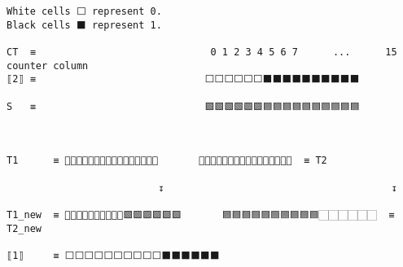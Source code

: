 \documentclass[varwidth=\maxdimen,margin=0.5cm,multi={verbatim}]{standalone}
\begin{document}
\begin{verbatim}
White cells ⬜ represent 0.
Black cells ⬛ represent 1.

CT  ≡                              0 1 2 3 4 5 6 7      ...      15  counter column
⟦2⟧ ≡                             ⬜⬜⬜⬜⬜⬜⬛⬛⬛⬛⬛⬛⬛⬛⬛⬛      

S   ≡                             🟩🟩🟩🟩🟩🟩🟦🟦🟦🟦🟦🟦🟦🟦🟦🟦



T1      ≡ 🏻🏻🏻🏻🏻🏻🏻🏻🏻🏻🏻🏻🏻🏻🏻🏻       🏻🏻🏻🏻🏻🏻🏻🏻🏻🏻🏻🏻🏻🏻🏻🏻  ≡ T2

                          ↧                                       ↧          

T1_new  ≡ 🏻🏻🏻🏻🏻🏻🏻🏻🏻🏻🟩🟩🟩🟩🟩🟩       🟦🟦🟦🟦🟦🟦🟦🟦🟦🟦🏻🏻🏻🏻🏻🏻  ≡ T2_new
                                    
⟦1⟧     ≡ ⬜⬜⬜⬜⬜⬜⬜⬜⬜⬜⬛⬛⬛⬛⬛⬛
\end{verbatim}
\end{document}

